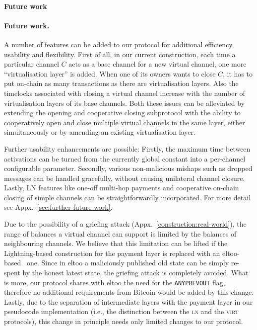 \makeatletter%
%
  {\paragraph{Future work}}%
  {\paragraph{Future work.}}%
\makeatother%
  A number of features can be added to our protocol for additional efficiency,
  usability and flexibility. First of all, in our current construction, each
  time a particular channel $C$ acts as a base
  channel for a new virtual channel, one more ``virtualisation layer'' is added. When
  one of its owners wants to close $C$, it has to put on-chain as many
  transactions as there are virtualisation layers. Also the timelocks associated
  with closing a virtual channel increase with the number of virtualisation
  layers of its base channels. Both these issues can be alleviated by extending
  the opening and cooperative closing subprotocol with the ability to
  cooperatively open and close multiple virtual channels in the same layer,
  either simultaneously or by amending an existing virtualisation layer.

  Further usability enhancements are possible: Firstly, the maximum time between
  activations can be turned from the currently global constant into a
  per-channel configurable parameter. Secondly, various non-malicious mishaps
  such as dropped messages can be handled gracefully, without causing unilateral
  channel closure. Lastly, LN features like one-off multi-hop payments and
  cooperative on-chain closing of simple channels can be straightforwardly
  incorporated. For more detail see Appx.~\ref{sec:further-future-work}.

  Due to the possibility of a griefing attack
  (Appx.~\ref{construction:real-world}), the range of balances a virtual
  channel can
  support is limited by the balances of neighbouring channels. We believe that
  this limitation can be lifted if the Lightning-based
  construction for the payment layer is replaced with an
  eltoo-based~\cite{eltoo} one. Since in eltoo a maliciously published
  old state can be simply re-spent by the honest latest state, the griefing
  attack is completely avoided. What is more, our protocol shares with eltoo the
  need for the \texttt{ANYPREVOUT} flag, therefore no additional
  requirements from Bitcoin would be added by this change. Lastly,
  due to the separation of intermediate layers with the payment layer in our
  pseudocode implementation (i.e., the distinction
  between the \textsc{ln} and the \textsc{virt} protocols), this change
  in principle needs only limited changes to our protocol.

